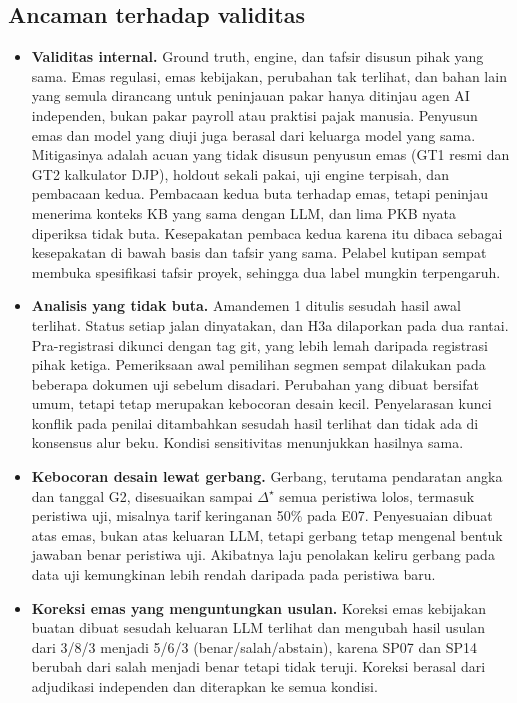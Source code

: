 \documentclass[journal,a4paper]{IEEEtran}
\makeatletter
\DeclareRobustCommand{\en}[1]{{\usefont{\f@encoding}{\f@family}{\f@series}{it}#1\/}}
\newcommand{\emas}{\star}
\makeatother
\begin{document}
\subsection{Ancaman terhadap validitas}
\label{subsec:ancaman}
\begin{itemize}[leftmargin=*,nosep]
  \item \textbf{Validitas internal.} \en{Ground truth}, \en{engine}, dan tafsir disusun pihak yang sama. Emas regulasi, emas kebijakan, perubahan tak terlihat, dan bahan lain yang semula dirancang untuk peninjauan pakar hanya ditinjau agen AI independen, bukan pakar \en{payroll} atau praktisi pajak manusia. Penyusun emas dan model yang diuji juga berasal dari keluarga model yang sama. Mitigasinya adalah acuan yang tidak disusun penyusun emas (GT1 resmi dan GT2 kalkulator DJP), \en{holdout} sekali pakai, uji \en{engine} terpisah, dan pembacaan kedua. Pembacaan kedua buta terhadap emas, tetapi peninjau menerima konteks KB yang sama dengan LLM, dan lima PKB nyata diperiksa tidak buta. Kesepakatan pembaca kedua karena itu dibaca sebagai kesepakatan di bawah basis dan tafsir yang sama. Pelabel kutipan sempat membuka spesifikasi tafsir proyek, sehingga dua label mungkin terpengaruh.
  \item \textbf{Analisis yang tidak buta.} Amandemen 1 ditulis sesudah hasil awal terlihat. Status setiap jalan dinyatakan, dan H3a dilaporkan pada dua rantai. Pra-registrasi dikunci dengan \en{tag} git, yang lebih lemah daripada registrasi pihak ketiga. Pemeriksaan awal pemilihan segmen sempat dilakukan pada beberapa dokumen uji sebelum disadari. Perubahan yang dibuat bersifat umum, tetapi tetap merupakan kebocoran desain kecil. Penyelarasan kunci konflik pada penilai ditambahkan sesudah hasil terlihat dan tidak ada di konsensus alur beku. Kondisi sensitivitas menunjukkan hasilnya sama.
  \item \textbf{Kebocoran desain lewat gerbang.} Gerbang, terutama pendaratan angka dan tanggal G2, disesuaikan sampai $\Delta^{\emas}$ semua peristiwa lolos, termasuk peristiwa uji, misalnya tarif keringanan 50\% pada E07. Penyesuaian dibuat atas emas, bukan atas keluaran LLM, tetapi gerbang tetap mengenal bentuk jawaban benar peristiwa uji. Akibatnya laju penolakan keliru gerbang pada data uji kemungkinan lebih rendah daripada pada peristiwa baru.
  \item \textbf{Koreksi emas yang menguntungkan usulan.} Koreksi emas kebijakan buatan dibuat sesudah keluaran LLM terlihat dan mengubah hasil usulan dari 3/8/3 menjadi 5/6/3 (benar/salah/\en{abstain}), karena SP07 dan SP14 berubah dari salah menjadi benar tetapi tidak teruji. Koreksi berasal dari adjudikasi independen dan diterapkan ke semua kondisi.

\end{itemize}
\end{document}
